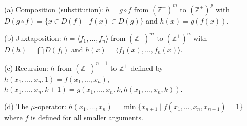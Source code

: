 (a) Composition (substitution): $h = g \circ f$ from $(\mathbb{Z}^+)^m$ to $(\mathbb{Z}^+)^p$ with $D(g \circ f) = \{x \in D(f) \mid f(x) \in D(g)\}$ and $h(x) = g(f(x))$.

(b) Juxtaposition: $h = \langle f_1, \ldots, f_n \rangle$ from $(\mathbb{Z}^+)^m$ to $(\mathbb{Z}^+)^n$ with $D(h) = \bigcap D(f_i)$ and $h(x) = \langle f_1(x), \ldots, f_n(x) \rangle$.

(c) Recursion: $h$ from $(\mathbb{Z}^+)^{n+1}$ to $\mathbb{Z}^+$ defined by
$h(x_1, \ldots, x_n, 1) = f(x_1, \ldots, x_n)$,
$h(x_1, \ldots, x_n, k+1) = g(x_1, \ldots, x_n, k, h(x_1, \ldots, x_n, k))$.

(d) The $\mu$-operator: $h(x_1, \ldots, x_n) = \min\{x_{n+1} \mid f(x_1, \ldots, x_n, x_{n+1}) = 1\}$ where $f$ is defined for all smaller arguments.